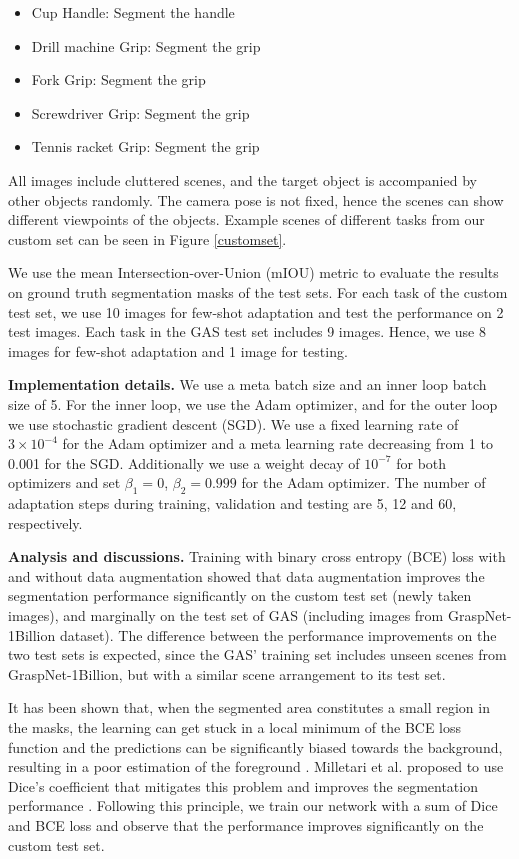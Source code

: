 \documentclass[letterpaper]{article} %
\begin{document}
\begin{itemize}
    \item Cup Handle: Segment the handle
    \item Drill machine Grip: Segment the grip
    \item Fork Grip: Segment the grip
    \item Screwdriver Grip: Segment the grip
    \item Tennis racket Grip: Segment the grip
\end{itemize}

All images include cluttered scenes, and the target object is accompanied by other objects randomly. The camera pose is not fixed, hence the scenes can show different viewpoints of the objects. Example scenes of different tasks from our custom set can be seen in Figure \ref{customset}.

We use the mean Intersection-over-Union (mIOU) metric to evaluate the results on ground truth segmentation masks of the test sets. For each task of the custom test set, we use 10 images for few-shot adaptation and test the performance on 2 test images. Each task in the GAS test set includes 9 images. Hence, we use 8 images for few-shot adaptation and 1 image for testing.

\textbf{Implementation details.} We use a meta batch size and an inner loop batch size of 5. For the inner loop, we use the Adam optimizer, and for the outer loop we use stochastic gradient descent (SGD). We use a fixed learning rate of $3 \times 10^{-4}$ for the Adam optimizer and a meta learning rate decreasing from 1 to 0.001 for the SGD. Additionally we use a weight decay of $10^{-7}$ for both optimizers and set $\beta_{1}=0$, $\beta_{2}=0.999$ for the Adam optimizer. The number of adaptation steps during training, validation and testing are 5, 12 and 60, respectively.

\textbf{Analysis and discussions.} Training with binary cross entropy (BCE) loss with and without data augmentation showed that data augmentation improves the segmentation performance significantly on the custom test set (newly taken images), and marginally on the test set of GAS (including images from GraspNet-1Billion dataset). The difference between the performance improvements on the two test sets is expected, since the GAS' training set includes unseen scenes from GraspNet-1Billion, but with a similar scene arrangement to its test set.

It has been shown that, when the segmented area constitutes a small region in the masks, the learning can get stuck in a local minimum of the BCE loss function and the predictions can be significantly biased towards the background, resulting in a poor estimation of the foreground \cite{milletari2016v}. Milletari et al. proposed to use Dice's coefficient that mitigates this problem and improves the segmentation performance \cite{milletari2016v}. Following this principle, we train our network with a sum of Dice and BCE loss and observe that the performance improves significantly on the custom test set. 
\end{document}
